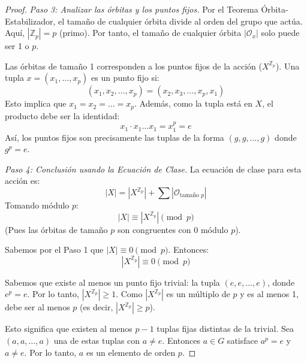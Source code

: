 \begin{proof}
    \textit{Paso 3: Analizar las órbitas y los puntos fijos.}
    Por el Teorema Órbita-Estabilizador, el tamaño de cualquier órbita divide al orden del grupo que actúa. Aquí, $|\mathbb{Z}_p| = p$ (primo).
    Por tanto, el tamaño de cualquier órbita $|\mathcal{O}_x|$ solo puede ser 1 o $p$.
    
    Las órbitas de tamaño 1 corresponden a los puntos fijos de la acción ($X^{\mathbb{Z}_p}$).
    Una tupla $x = (x_1, \dots, x_p)$ es un punto fijo si:
    \begin{equation*}
        (x_1, x_2, \dots, x_p) = (x_2, x_3, \dots, x_p, x_1)
    \end{equation*}
    Esto implica que $x_1 = x_2 = \dots = x_p$.
    Además, como la tupla está en $X$, el producto debe ser la identidad:
    \begin{equation*}
        x_1 \cdot x_1 \dots x_1 = x_1^p = e
    \end{equation*}
    Así, los puntos fijos son precisamente las tuplas de la forma $(g, g, \dots, g)$ donde $g^p = e$.

    \textit{Paso 4: Conclusión usando la Ecuación de Clase.}
    La ecuación de clase para esta acción es:
    \begin{equation*}
        |X| = |X^{\mathbb{Z}_p}| + \sum |\mathcal{O}_{\text{tamaño } p}|
    \end{equation*}
    Tomando módulo $p$:
    \begin{equation*}
        |X| \equiv |X^{\mathbb{Z}_p}| \pmod p
    \end{equation*}
    (Pues las órbitas de tamaño $p$ son congruentes con 0 módulo $p$).
    
    Sabemos por el Paso 1 que $|X| \equiv 0 \pmod p$. Entonces:
    \begin{equation*}
        |X^{\mathbb{Z}_p}| \equiv 0 \pmod p
    \end{equation*}
    
    Sabemos que existe al menos un punto fijo trivial: la tupla $(e, e, \dots, e)$, donde $e^p = e$.
    Por lo tanto, $|X^{\mathbb{Z}_p}| \ge 1$.
    Como $|X^{\mathbb{Z}_p}|$ es un múltiplo de $p$ y es al menos 1, debe ser al menos $p$ (es decir, $|X^{\mathbb{Z}_p}| \ge p$).
    
    Esto significa que existen al menos $p-1$ tuplas fijas distintas de la trivial.
    Sea $(a, a, \dots, a)$ una de estas tuplas con $a \neq e$.
    Entonces $a \in G$ satisface $a^p = e$ y $a \neq e$.
    Por lo tanto, $a$ es un elemento de orden $p$.
\end{proof}


